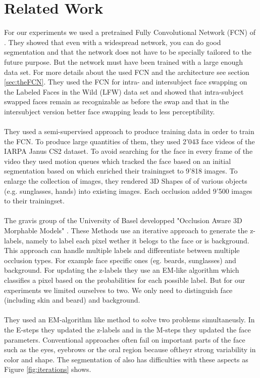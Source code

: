 \section{Related Work}
For our experiments we used a pretrained Fully Convolutional Network (FCN) of \cite{nirkin2018_faceswap}. They showed that even with a widespread network, you can do good segmentation and that the network does not have to be specially tailored to the future purpose. But the network must have been trained with a large enough data set. For more details about the used FCN and the architecture see section \ref{sec:theFCN}. They used the FCN for intra- and intersubject face swapping on the Labeled Faces in the Wild (LFW) data set and showed that intra-subject swapped faces remain as recognizable as before the swap and that in the intersubject version better face swapping  leads to less perceptibility.\\
\\
They used a semi-supervised approach to produce training data in order to train the FCN. To produce large quantities of them, they used 2'043 face videos of the IARPA Janus CS2 dataset. To avoid searching for the face in every frame of the video they used motion queues which tracked the face based on an initial segmentation based on \cite{grundmann} which enriched their trainingset to 9'818 images. To enlarge the collection of images, they rendered 3D Shapes of of various objects (e.g. sunglasses, hands) into existing images. Each occlusion added 9'500 images to their trainingset.\\
\\
The gravis group of the University of Basel developped "Occlusion Aware 3D Morphable Models" \cite{egger_paper}. These Methods use an iterative approach to generate the z-labels, namely to label each pixel wether it belogs to the face or is background. This approach can handle multiple labels and differentiate between multiple occlusion types. For example face specific ones (eg. beards, sunglasses) and background. For updating the z-labels they use an EM-like algorithm which classifies a pixel based on the probabilities for each possible label.  But for our experiments we limited ourselves to two. We only need to distinguish face (including skin and beard) and background.\\ 
\\
They used an EM-algorithm like method to solve two problems simultaneusly. In the E-steps they updated the z-labels and in the M-steps they updated the face parameters. Conventional approaches often fail on important parts of the face such as the eyes, eyebrows or the oral region because oftheyr strong variability in color and shape. The segmentation of \cite{egger_paper} also has difficulties with these aspects as Figure \ref{fig:iterations} shows.

